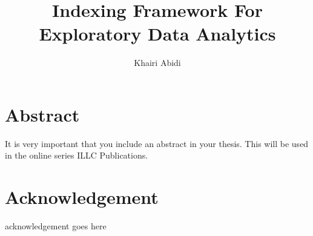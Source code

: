 \documentclass[titlepage]{report}
\begin{document}
\title{Indexing Framework For Exploratory Data Analytics}
\author{Khairi Abidi}
\maketitle

\tableofcontents

\chapter*{Abstract}
\begin{center}
    It is very important that you include an abstract in your thesis. This will be used in the online series ILLC Publications.
\end{center}

\chapter*{Acknowledgement}
\begin{center}
    acknowledgement goes here
\end{center}







\end{document}
